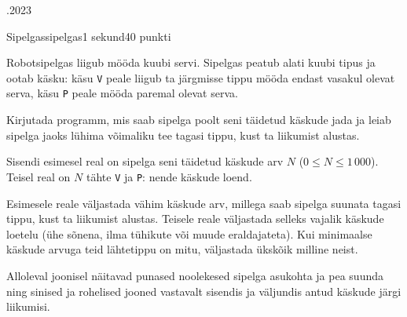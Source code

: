 \documentclass[a4paper,11pt]{article}
\begin{document}
\begin{ol}{\eio}{.2023}{\yle}{}
\begin{yl}{4}{Sipelgas}{sipelgas}{1 sekund}{40 punkti}

Robotsipelgas liigub mööda kuubi servi. Sipelgas peatub alati kuubi tipus ja ootab käsku: käsu \verb|V| peale liigub ta järgmisse tippu mööda endast vasakul olevat serva, käsu \verb|P| peale mööda paremal olevat serva.

Kirjutada programm, mis saab sipelga poolt seni täidetud käskude jada ja leiab sipelga jaoks lühima võimaliku tee tagasi tippu, kust ta liikumist alustas.

\sis
Sisendi esimesel real on sipelga seni täidetud käskude arv $N$ ($0 \le N \le 1\,000$).
Teisel real on $N$ tähte \verb|V| ja \verb|P|: nende käskude loend.

\val 
Esimesele reale väljastada vähim käskude arv, millega saab sipelga suunata tagasi tippu, kust ta liikumist alustas.
Teisele reale väljastada selleks vajalik käskude loetelu (ühe sõnena, ilma tühikute või muude eraldajateta).
Kui minimaalse käskude arvuga teid lähtetippu on mitu, väljastada ükskõik milline neist.

\nde[0]{3cm}{3cm}

Alloleval joonisel näitavad punased noolekesed sipelga asukohta ja pea suunda ning sinised ja rohelised jooned vastavalt sisendis ja väljundis antud käskude järgi liikumisi.


\end{yl}
\end{ol}
\end{document}
